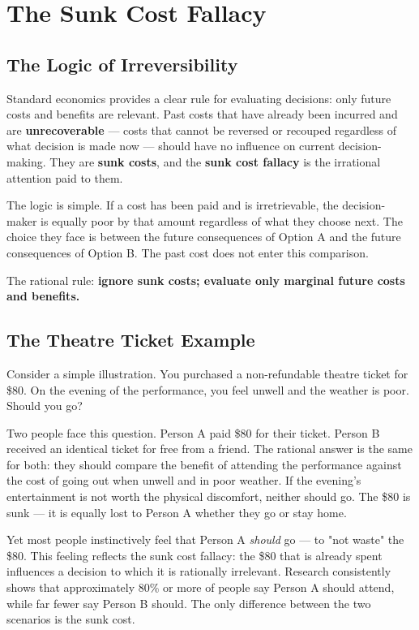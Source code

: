 \documentclass[12pt, letterpaper]{article}
\begin{document}
\medskip


\section{The Sunk Cost Fallacy}



\subsection{The Logic of Irreversibility}


Standard economics provides a clear rule for evaluating decisions: only future costs and benefits are relevant. Past costs that have already been incurred and are \textbf{unrecoverable} --- costs that cannot be reversed or recouped regardless of what decision is made now --- should have no influence on current decision-making. They are \textbf{sunk costs}, and the \textbf{sunk cost fallacy} is the irrational attention paid to them.

The logic is simple. If a cost has been paid and is irretrievable, the decision-maker is equally poor by that amount regardless of what they choose next. The choice they face is between the future consequences of Option A and the future consequences of Option B. The past cost does not enter this comparison.

The rational rule: \textbf{ignore sunk costs; evaluate only marginal future costs and benefits.}


\subsection{The Theatre Ticket Example}


Consider a simple illustration. You purchased a non-refundable theatre ticket for \$80. On the evening of the performance, you feel unwell and the weather is poor. Should you go?

Two people face this question. Person A paid \$80 for their ticket. Person B received an identical ticket for free from a friend. The rational answer is the same for both: they should compare the benefit of attending the performance against the cost of going out when unwell and in poor weather. If the evening's entertainment is not worth the physical discomfort, neither should go. The \$80 is sunk --- it is equally lost to Person A whether they go or stay home.

Yet most people instinctively feel that Person A \textit{should} go --- to "not waste" the \$80. This feeling reflects the sunk cost fallacy: the \$80 that is already spent influences a decision to which it is rationally irrelevant. Research consistently shows that approximately 80\% or more of people say Person A should attend, while far fewer say Person B should. The only difference between the two scenarios is the sunk cost.
\end{document}
